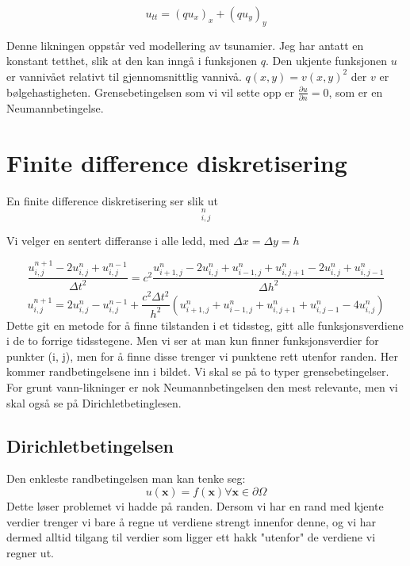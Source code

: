 \documentclass[a4paper, 10pt]{article}
\newcommand{\mb}{\mathbf}
\newcommand{\p}{\partial}
\begin{document}
\begin{equation}
	u_{tt} = (qu_x)_x + (qu_y)_y
\end{equation}

Denne likningen oppstår ved modellering av tsunamier. Jeg har antatt en konstant tetthet, slik at den kan inngå i funksjonen $q$. Den ukjente funksjonen $u$ er vannivået relativt til gjennomsnittlig vannivå. $q(x, y) = v(x, y)^2$ der $v$ er bølgehastigheten. Grensebetingelsen som vi vil sette opp er $\frac{\p u}{\p n} = 0$, som er en Neumannbetingelse.


\section{Finite difference diskretisering}

En finite difference diskretisering ser slik ut
\begin{equation}
	[D_tD_t u = D_xqD_xu + D_yqD_yu]_{i, j}^n
\end{equation}

Vi velger en sentert differanse i alle ledd, med $\Delta x = \Delta y = h$

\begin{equation}
	\frac{u_{i, j}^{n+1} - 2u_{i,j}^n + u_{i, j}^{n-1}}{\Delta t^2} = c^2\frac{u_{i+1, j}^n - 2u_{i, j}^n + u_{i-1, j}^n + u_{i, j+1}^n - 2u_{i, j}^n + u_{i, j-1}^n}{\Delta h^2}
\end{equation}
\begin{equation}
	u_{i, j}^{n+1} = 2u_{i,j}^n - u_{i,j}^{n-1} + \frac{c^2 \Delta t^2}{h^2}\left( u_{i+1, j}^n + u_{i-1, j}^n + u_{i, j+1}^n + u_{i, j-1}^n - 4u_{i,j}^n\right)
\end{equation}
Dette git en metode for å finne tilstanden i et tidssteg, gitt alle funksjonsverdiene i de to forrige tidsstegene. Men vi ser at man kun finner funksjonsverdier for punkter (i, j), men for å finne disse trenger vi punktene rett utenfor randen. Her kommer randbetingelsene inn i bildet. Vi skal se på to typer grensebetingelser. For grunt vann-likninger er nok Neumannbetingelsen den mest relevante, men vi skal også se på Dirichletbetinglesen. 

\subsection{Dirichletbetingelsen}
Den enkleste randbetingelsen man kan tenke seg:
\begin{equation}
	u(\mb{x}) = f(\mb{x}) \forall \mb{x} \in \p\Omega
\end{equation}
Dette løser problemet vi hadde på randen. Dersom vi har en rand med kjente verdier trenger vi bare å regne ut verdiene strengt innenfor denne, og vi har dermed alltid tilgang til verdier som ligger ett hakk "utenfor" de verdiene vi regner ut. 
\end{document}
